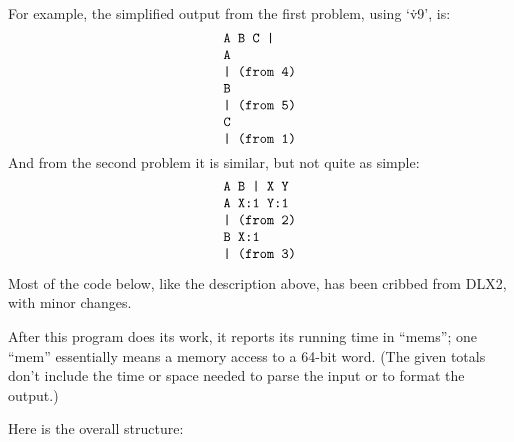 For example, the simplified output from the first problem,
using `\.{v9}', is:
$$\vcenter{\halign{\tt#\cr
A B C \char"7C\cr
A\cr
\char"7C\ (from 4)\cr
B\cr
\char"7C\ (from 5)\cr
C\cr
\char"7C\ (from 1)\cr
}}$$
And from the second problem it is similar, but not quite as simple:
$$\vcenter{\halign{\tt#\cr
A B \char"7C\ X Y\cr
A X:1 Y:1\cr
\char"7C\ (from 2)\cr
B X:1\cr
\char"7C\ (from 3)\cr
}}$$

\fi

Most of the code below, like the description above, has been cribbed
from {\mc DLX2}, with minor changes.

After this program does its work, it reports its
running time in ``mems''; one ``mem'' essentially means a
memory access to a 64-bit word.
(The given totals don't include the time or space needed to parse the
input or to format the output.)

Here is the overall structure:


